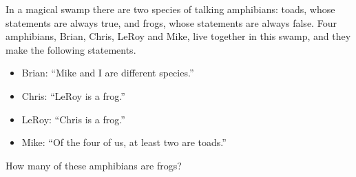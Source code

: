 In a magical swamp there are two species of talking amphibians: toads, whose statements are always true, and frogs, whose statements are always false. Four amphibians, Brian, Chris, LeRoy and Mike, live together in this swamp, and they make the following statements.
\begin{itemize}
\item Brian: ``Mike and I are different species.''
\item Chris: ``LeRoy is a frog.''
\item LeRoy: ``Chris is a frog.''
\item Mike: ``Of the four of us, at least two are toads.''
\end{itemize}
How many of these amphibians are frogs?
